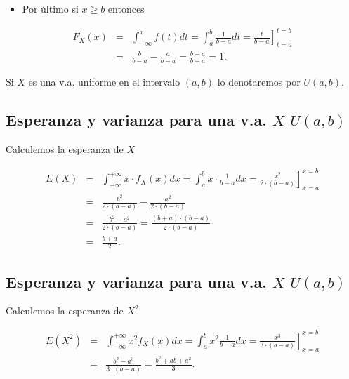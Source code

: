 \documentclass[]{book}
\providecommand{\tightlist}{%
  \setlength{\itemsep}{0pt}\setlength{\parskip}{0pt}}
\begin{document}
\begin{itemize}
\tightlist
\item
  Por último si \(x\geq b\) entonces
\end{itemize}

\[
\begin{eqnarray*}
F_X(x)&=&\displaystyle\int_{-\infty}^{x} f(t) dt=\int_{a}^{b} \frac{1}{b-a} dt=
  \left.  \frac{t}{b-a} \right]_{t=a}^{t=b}
\\&=& \frac{b}{b-a}-\frac{a}{b-a}=\frac{b-a}{b-a}=1.
\end{eqnarray*}
\]

Si \(X\) es una v.a. uniforme en el intervalo \((a,b)\) lo denotaremos por \(U(a,b)\).

\hypertarget{esperanza-y-varianza-para-una-v.a.-x-uab}{%
\subsection{\texorpdfstring{Esperanza y varianza para una v.a. \(X\) \(U(a,b)\)}{Esperanza y varianza para una v.a. X U(a,b)}}\label{esperanza-y-varianza-para-una-v.a.-x-uab}}

Calculemos la esperanza de \(X\)

\[
\begin{eqnarray*}
E(X)&=&\displaystyle\int_{-\infty}^{+\infty} x\cdot f_X(x) dx =\int_{a}^{b} x \cdot \frac{1}{b-a} dx =
\left.\frac{x^2}{2\cdot (b-a)}\right]_{x=a}^{x=b}\\
&=&\frac{b^2}{2\cdot (b-a)}-\frac{a^2}{2\cdot (b-a)}\\
&=&
\frac{b^2-a^2}{2\cdot (b-a)}=\frac{(b+a)\cdot (b-a)}{2\cdot (b-a)}\\
&=&
\frac{b+a}{2}.
\end{eqnarray*}
\]

\hypertarget{esperanza-y-varianza-para-una-v.a.-x-uab-1}{%
\subsection{\texorpdfstring{Esperanza y varianza para una v.a. \(X\) \(U(a,b)\)}{Esperanza y varianza para una v.a. X U(a,b)}}\label{esperanza-y-varianza-para-una-v.a.-x-uab-1}}

Calculemos la esperanza de \(X^2\)

\[
\begin{eqnarray*}
E(X^2)&=&\displaystyle\int_{-\infty}^{+\infty} x^2 f_X(x) dx=\int_{a}^{b} x^2 \frac1{b-a}
dx =\left.\frac{x^3}{3\cdot (b-a)}\right]_{x=a}^{x=b} \\
&=&\frac{b^3-a^3}{3\cdot (b-a)}=\frac{b^2+ab+a^2}{3}.
\end{eqnarray*}
\]
\end{document}
